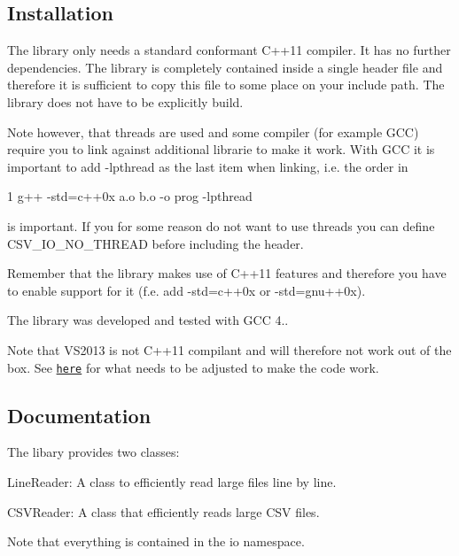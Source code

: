 \subsection*{Installation}

The library only needs a standard conformant C++11 compiler. It has no further dependencies. The library is completely contained inside a single header file and therefore it is sufficient to copy this file to some place on your include path. The library does not have to be explicitly build.

Note however, that threads are used and some compiler (for example G\+CC) require you to link against additional librarie to make it work. With G\+CC it is important to add -\/lpthread as the last item when linking, i.\+e. the order in


\begin{DoxyCode}
1 g++ -std=c++0x a.o b.o -o prog -lpthread
\end{DoxyCode}


is important. If you for some reason do not want to use threads you can define C\+S\+V\+\_\+\+I\+O\+\_\+\+N\+O\+\_\+\+T\+H\+R\+E\+AD before including the header.

Remember that the library makes use of C++11 features and therefore you have to enable support for it (f.\+e. add -\/std=c++0x or -\/std=gnu++0x).

The library was developed and tested with G\+CC 4..

Note that V\+S2013 is not C++11 compilant and will therefore not work out of the box. See \href{https://code.google.com/p/fast-cpp-csv-parser/issues/detail?id=6}{\tt here} for what needs to be adjusted to make the code work.

\subsection*{Documentation}

The libary provides two classes\+:


\begin{DoxyItemize}
\item {\ttfamily Line\+Reader}\+: A class to efficiently read large files line by line.
\item {\ttfamily C\+S\+V\+Reader}\+: A class that efficiently reads large C\+SV files.
\end{DoxyItemize}

Note that everything is contained in the {\ttfamily io} namespace.

